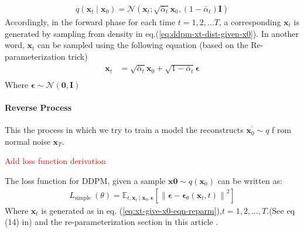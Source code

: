 \documentclass[11pt]{article}
\begin{document}
    \begin{equation}
        \label{eq:ddpm-xt-dist-given-x0}
        \begin{aligned}
            q\left(\mathbf{x}_t \mid \mathbf{x}_0\right)=\mathcal{N}\left(\mathbf{x}_t ;
            \sqrt{\bar{\alpha}_t} \mathbf{x}_0,\left(1-\bar{\alpha}_t\right) \mathbf{I}\right)
        \end{aligned}
    \end{equation}
    Accordingly, in the forward phase for each time $t=1,2,\dots T$, a corresponding $\mathbf{x}_t$ is generated by
    sampling from density in eq.(\ref{eq:ddpm-xt-dist-given-x0}). In another word, $\mathbf{x}_t$ can be sampled using
    the following equation (based on the Re-parameterization trick\cite{kingma2022autoencoding,TheRepar23:online})
    \begin{equation}
        \label{eq:xt-give-x0-eqn-reparm}
        \begin{aligned}
            \mathbf{x}_t &=\sqrt{\bar{\alpha}_t} \mathbf{x}_0+\sqrt{1-\bar{\alpha}_t} \boldsymbol{\epsilon}\\
        \end{aligned}
    \end{equation}
    Where $\bm{\epsilon} \sim \mathcal{N}(\mathbf{0},\mathbf{I})$

    \paragraph{Reverse Process}
    This the process in which we try to train a model the reconstructs $\mathbf{x}^{'}_0 \sim q$ f
    rom normal noise $\mathbf{x}_T$.

    \newline
    \textcolor{red}{Add loss function derivation}
    \newline

    The loss function for DDPM, given a sample $\mathbf{x0} \sim q(\mathbf{x}_0)$ can be written as:
    \begin{equation}
        \begin{aligned}
            L_{\text {simple }}(\theta) =\mathbb{E}_{t,\mathbf{x}_t \mid \mathbf{x}_0,
            \boldsymbol{\epsilon}}\left[\left\|\boldsymbol{\epsilon}-\boldsymbol{\epsilon}_
            \theta\left(\mathbf{x}_t, t\right)\right\|^2\right]
        \end{aligned}
        \label{eq:ddpm-loss-simple}
    \end{equation}
    Where $\mathbf{x}_t$ is generated as in eq. (\ref{eq:xt-give-x0-eqn-reparm}),$t=1,2,\dots,T$.(See eq (14)
    in\cite{ho2020denoising}) and the re-parameterization section in this article \cite{WhatareD38:online}.\par
\end{document}
